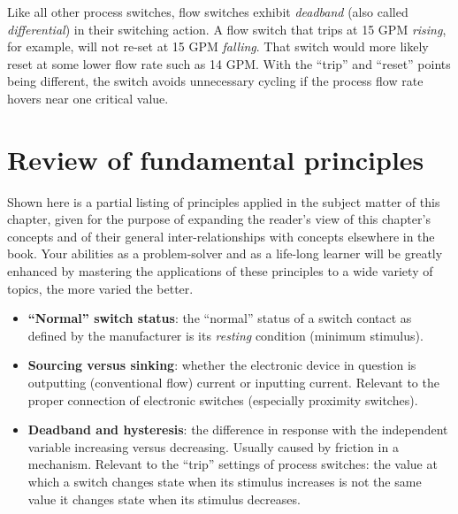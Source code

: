 Like all other process switches, flow switches exhibit \textit{deadband} (also called \textit{differential}) in their switching action.  A flow switch that trips at 15 GPM \textit{rising}, for example, will not re-set at 15 GPM \textit{falling}.  That switch would more likely reset at some lower flow rate such as 14 GPM.  With the ``trip'' and ``reset'' points being different, the switch avoids unnecessary cycling if the process flow rate hovers near one critical value.     








\filbreak
\section{Review of fundamental principles}

Shown here is a partial listing of principles applied in the subject matter of this chapter, given for the purpose of expanding the reader's view of this chapter's concepts and of their general inter-relationships with concepts elsewhere in the book.  Your abilities as a problem-solver and as a life-long learner will be greatly enhanced by mastering the applications of these principles to a wide variety of topics, the more varied the better.

\begin{itemize}
\item \textbf{``Normal'' switch status}: the ``normal'' status of a switch contact as defined by the manufacturer is its \textit{resting} condition (minimum stimulus).
\item \textbf{Sourcing versus sinking}: whether the electronic device in question is outputting (conventional flow) current or inputting current.  Relevant to the proper connection of electronic switches (especially proximity switches).
\item \textbf{Deadband and hysteresis}: the difference in response with the independent variable increasing versus decreasing.  Usually caused by friction in a mechanism.  Relevant to the ``trip'' settings of process switches: the value at which a switch changes state when its stimulus increases is not the same value it changes state when its stimulus decreases.
\end{itemize}









